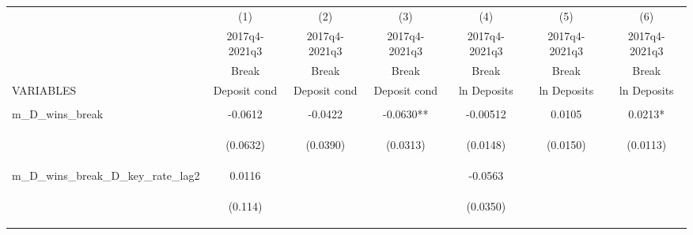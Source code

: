 \documentclass[]{article}
\begin{document}
\begin{center}
\begin{tabular}{lcccccc} \hline
 & (1) & (2) & (3) & (4) & (5) & (6) \\
 & 2017q4-2021q3 & 2017q4-2021q3 & 2017q4-2021q3 & 2017q4-2021q3 & 2017q4-2021q3 & 2017q4-2021q3 \\
 & Break & Break & Break & Break & Break & Break \\
VARIABLES & Deposit cond & Deposit cond & Deposit cond & ln Deposits & ln Deposits & ln Deposits \\ \hline
\vspace{4pt} & \begin{footnotesize}\end{footnotesize} & \begin{footnotesize}\end{footnotesize} & \begin{footnotesize}\end{footnotesize} & \begin{footnotesize}\end{footnotesize} & \begin{footnotesize}\end{footnotesize} & \begin{footnotesize}\end{footnotesize} \\
m\_D\_wins\_break & -0.0612 & -0.0422 & -0.0630** & -0.00512 & 0.0105 & 0.0213* \\
\vspace{4pt} & \begin{footnotesize}(0.0632)\end{footnotesize} & \begin{footnotesize}(0.0390)\end{footnotesize} & \begin{footnotesize}(0.0313)\end{footnotesize} & \begin{footnotesize}(0.0148)\end{footnotesize} & \begin{footnotesize}(0.0150)\end{footnotesize} & \begin{footnotesize}(0.0113)\end{footnotesize} \\
m\_D\_wins\_break\_D\_key\_rate\_lag2 & 0.0116 &  &  & -0.0563 &  &  \\
\vspace{4pt} & \begin{footnotesize}(0.114)\end{footnotesize} & \begin{footnotesize}\end{footnotesize} & \begin{footnotesize}\end{footnotesize} & \begin{footnotesize}(0.0350)\end{footnotesize} & \begin{footnotesize}\end{footnotesize} & \begin{footnotesize}\end{footnotesize} \\

\end{tabular}
\end{center}
\end{document}

